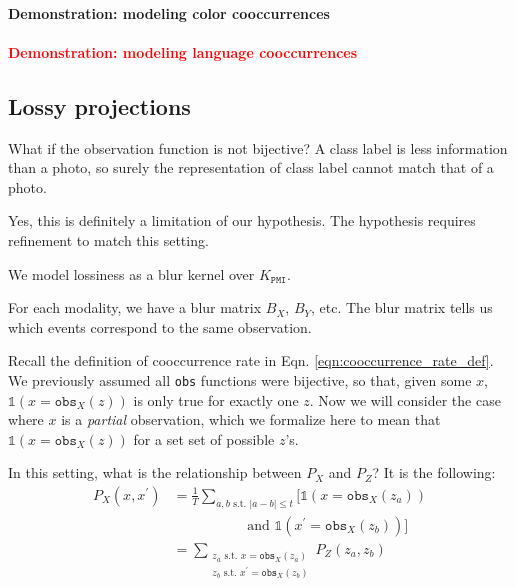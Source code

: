 
\paragraph{Demonstration: modeling color cooccurrences}


\paragraph{\textcolor{red}{Demonstration: modeling language cooccurrences}}






\subsection{Lossy projections}

What if the observation function is not bijective? A class label is less information than a photo, so surely the representation of class label cannot match that of a photo.

Yes, this is definitely a limitation of our hypothesis. The hypothesis requires refinement to match this setting.

We model lossiness as a blur kernel over $K_{\texttt{PMI}}$.

For each modality, we have a blur matrix $B_{X}$, $B_{Y}$, etc. The blur matrix tells us which events correspond to the same observation. 

Recall the definition of cooccurrence rate in Eqn. \ref{eqn:cooccurrence_rate_def}. We previously assumed all \texttt{obs} functions were bijective, so that, given some $x$, $\mathds{1}(x = \texttt{obs}_X(z))$ is only true for exactly one $z$. Now we will consider the case where $x$ is a \textit{partial} observation, which we formalize here to mean that $\mathds{1}(x = \texttt{obs}_X(z))$ for a set set of possible $z$'s. 

In this setting, what is the relationship between $P_X$ and $P_Z$? It is the following:
\begin{align}
    P_X(x, x^{\prime}) &= \frac{1}{T} \sum_{a,b \text{ s.t. } |a-b| \leq t} [\mathds{1}(x = \texttt{obs}_X(z_a)) \nonumber \\ & \quad\quad\quad\quad\quad\text{ and } \mathds{1}(x^{\prime} = \texttt{obs}_X(z_b))] \\
    &= \underset{\substack{
    z_a \text{ s.t. } x = \texttt{obs}_X(z_a)\\
    z_b \text{ s.t. } x^{\prime} = \texttt{obs}_X(z_b)
    }}\sum P_Z(z_a, z_b)
\end{align}

